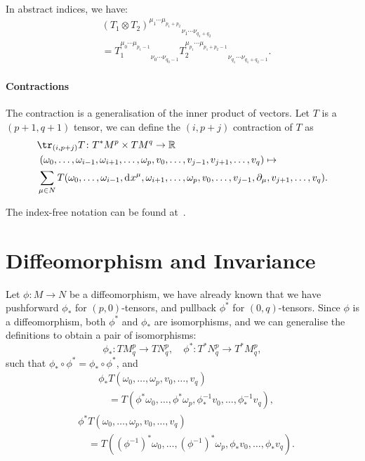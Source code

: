 \documentclass[openany, oneside, a5paper]{book}
\begin{document}
In abstract indices, we have:
\begin{align}
    &{(T_1 \otimes T_2)^{\mu_1 \cdots \mu_{p_1 + p_2}}}_{\nu_1 \cdots \nu_{q_1 + q_2}}
    \\
    &= {T_1^{\mu_0 \cdots \mu_{p_1 - 1}}}_{\nu_0 \cdots \nu_{q_0 - 1}} 
    {T_2^{\mu_{p_1} \cdots \mu_{p_1 + p_2 - 1}}}_{\nu_{q_1} \cdots \nu_{q_1 + q_2 - 1}}.
\end{align}

\paragraph{Contractions}

The contraction is a generalisation of the inner product of vectors.
Let $T$ is a $(p + 1, q + 1)$ tensor, we can define the $(i, p + j)$ contraction of $T$ as
{\small
\begin{align}
    &\tr_{(i, p+j)} T \colon  T^*M^p \times TM^q \to \mathbb{R}
    \\
    &\; (\omega_0, \ldots, \omega_{i-1}, \omega_{i+1}, \ldots, \omega_p,  v_0, \ldots, v_{j-1},  v_{j+1}, \ldots, v_q) \mapsto 
    \\
    &
    \sum_{\mu \in N} T(\omega_0, \ldots, \omega_{i-1}, \dif x^\mu,\omega_{i+1}, \ldots, \omega_p,  v_0, \ldots, v_{j-1},  \partial_\mu,v_{j+1}, \ldots, v_q).
\end{align}
}

The index-free notation can be found at~\cite{Yuri-Vyatkin-StackExchange}.

\section{Diffeomorphism and Invariance}

Let $\phi \colon M \to N$ be a diffeomorphism, we have already known that we have pushforward $\phi_*$ for $(p, 0)$-tensors, and pullback $\phi^*$ for $(0, q)$-tensors.
Since $\phi$ is a diffeomorphism, both $\phi^*$ and $\phi_*$ are isomorphisms, and we can generalise the definitions to obtain a pair of isomorphisms:
\begin{equation}
    \phi_* \colon TM^p_q \to TN^p_q, \quad \phi^* \colon T^*N^p_q \to T^*M^p_q,
\end{equation}
such that $\phi_* \circ \phi^* = \phi_* \circ \phi^*$, and
\begin{align}
    &\phi_* T(\omega_0, \ldots, \omega_p, v_0, \ldots, v_q)
    \\
    &\quad =
    T(\phi^* \omega_0, \ldots, \phi^* \omega_p, \phi^{-1}_* v_0, \ldots, \phi^{-1}_* v_q),
\end{align}
\begin{align}
    &\phi^* T(\omega_0, \ldots, \omega_p, v_0, \ldots, v_q)
    \\
    &\quad =
    T((\phi^{-1})^* \omega_0, \ldots, (\phi^{-1})^* \omega_p, \phi_* v_0, \ldots, \phi_* v_q).
\end{align}
\end{document}
